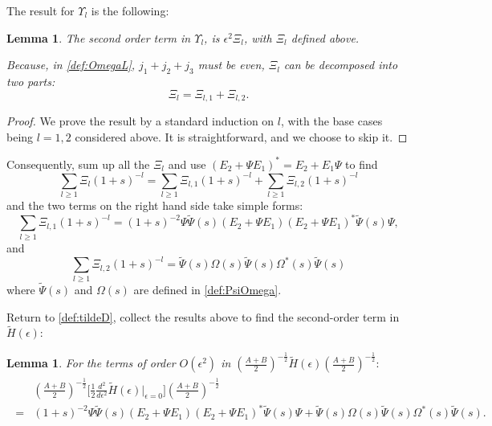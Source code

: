 \documentclass{article}
\numberwithin{equation}{section}
\newtheorem{lemma}[theorem]{Lemma}
\begin{document}
The result for $\Upsilon_l$ is the following:
\begin{lemma}
The second order term in $\Upsilon_{l}$,
is $\epsilon^2\Xi_l$, with $\Xi_l$ defined above.

Because, in \eqref{def:OmegaL}, $j_1+j_2+j_3$ must be even, 
$\Xi_l$ can be decomposed into two parts:
\begin{equation}\label{eq:OmegaL}
\Xi_{l} = \Xi_{l,1}+\Xi_{l,2}.
\end{equation}
\end{lemma}
\begin{proof}
    We prove the result by a standard induction on $l$, with the base cases being $l=1,2$ considered above. It is straightforward, and we choose to skip it.
\end{proof}


Consequently, sum up all the $\Xi_l$ and use $(E_2 + \Psi E_1)^*=E_2+E_1\Psi$ to find
\begin{equation}
    \sum_{l \geq 1} \Xi_{l} (1+s)^{-l}=\sum_{l \geq 1} \Xi_{l, 1} (1+s)^{-l}+\sum_{l \geq 1} \Xi_{l, 2} (1+s)^{-l}
\end{equation}
and the two terms on the right hand side take simple forms:
\begin{equation*}
\sum_{l \geq 1} \Xi_{l, 1} (1+s)^{-l} = (1+s)^{-2} \Psi \tilde{\Psi}(s) (E_2 + \Psi E_1) (E_2 + \Psi E_1)^* \tilde{\Psi}(s) \Psi,
\end{equation*}
and
\begin{equation*}
\sum_{l \geq 1} \Xi_{l, 2} (1+s)^{-l} = \tilde{\Psi}(s) \Omega(s) \tilde{\Psi}(s) \Omega^*(s) \tilde{\Psi}(s)
\end{equation*}
where $\tilde{\Psi}(s)$ and $\Omega(s)$ are defined in \eqref{def:PsiOmega}.

Return to \eqref{def:tildeD}, collect the results above to find the second-order term in $\tilde{H}(\epsilon):$
\begin{lemma}\label{LM:tildeD}
  For the terms of order $O(\epsilon^2)$ in $\left( \frac{A+B}{2} \right)^{-\frac{1}{2}}\tilde{H}(\epsilon)\left( \frac{A+B}{2} \right)^{-\frac{1}{2}}:$
  \begin{align}
  \begin{split}
  &\left( \frac{A+B}{2} \right)^{-\frac{1}{2}}\Big[\frac{1}{2}\frac{d^2}{d\epsilon^2}\tilde{H}(\epsilon)\big|_{\epsilon=0}\Big]\left( \frac{A+B}{2} \right)^{-\frac{1}{2}}\\
  =&(1+s)^{-2} \Psi \tilde{\Psi}(s) (E_2 + \Psi E_1) (E_2 + \Psi E_1)^* \tilde{\Psi}(s) \Psi+\tilde{\Psi}(s) \Omega(s) \tilde{\Psi}(s) \Omega^*(s) \tilde{\Psi}(s).
  \end{split}
  \end{align}
  
\end{lemma}
\end{document}
